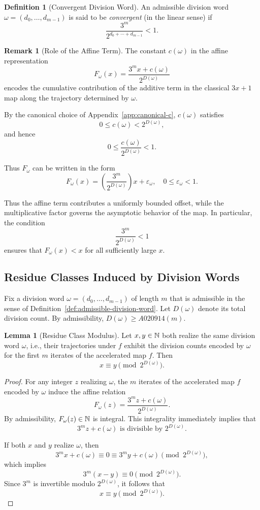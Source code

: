 \documentclass[12pt, oneside]{article}   	%
\numberwithin{equation}{section}          %
\theoremstyle{definition}
\newtheorem{define}{Definition}[section]
\newtheorem{lemma}[theorem]{Lemma}
\newtheorem*{remark}{Remark}
\begin{document}
\begin{define}[Convergent Division Word]
An admissible division word $\omega = (d_0,\dots,d_{m-1})$ is said to be
\emph{convergent} (in the linear sense) if
\[
\frac{3^m}{2^{d_0+\cdots+d_{m-1}}} < 1.
\]
\end{define}

\begin{remark}[Role of the Affine Term]
The constant $c(\omega)$ in the affine representation
\[
F_\omega(x) = \frac{3^m x + c(\omega)}{2^{D(\omega)}}
\]
encodes the cumulative contribution of the additive term in the classical
$3x+1$ map along the trajectory determined by $\omega$.

By the canonical choice of Appendix~\ref{app:canonical-c}, $c(\omega)$ satisfies
\[
0 \le c(\omega) < 2^{D(\omega)},
\]
and hence
\[
0 \le \frac{c(\omega)}{2^{D(\omega)}} < 1.
\]

Thus $F_\omega$ can be written in the form
\[
F_\omega(x) = \left(\frac{3^m}{2^{D(\omega)}}\right)x + \varepsilon_\omega,
\quad 0 \le \varepsilon_\omega < 1.
\]

Thus the affine term contributes a uniformly bounded offset,
while the multiplicative factor governs the asymptotic behavior of the map.
In particular, the condition
\[
\frac{3^m}{2^{D(\omega)}} < 1
\]
ensures that $F_\omega(x) < x$ for all sufficiently large $x$.
\end{remark}


\subsection{Residue Classes Induced by Division Words}

Fix a division word $\omega = (d_0,\dots,d_{m-1})$ of length $m$ that is admissible
in the sense of Definition~\ref{def:admissible-division-word}. Let $D(\omega)$
denote its total division count. By admissibility, $D(\omega) \ge A020914(m)$.

\begin{lemma}[Residue Class Modulus]
\label{lem:residue-modulus}
Let $x,y \in \mathbb{N}$ both realize the same division word $\omega$, i.e.,
their trajectories under $f$ exhibit the division counts encoded by $\omega$
for the first $m$ iterates of the accelerated map $f$. Then
\[
x \equiv y \pmod{2^{D(\omega)}}.
\]
\end{lemma}

\begin{proof}
For any integer $z$ realizing $\omega$, the $m$ iterates of the accelerated map
$f$ encoded by $\omega$ induce the affine relation
\[
F_\omega(z) = \frac{3^m z + c(\omega)}{2^{D(\omega)}}.
\]
By admissibility, $F_\omega(z)\in\mathbb{N}$ is integral. This integrality
immediately implies that
\[
3^m z + c(\omega) \text{ is divisible by } 2^{D(\omega)}.
\]

If both $x$ and $y$ realize $\omega$, then
\[
3^m x + c(\omega) \equiv 0 \equiv 3^m y + c(\omega) \pmod{2^{D(\omega)}},
\]
which implies
\[
3^m(x-y) \equiv 0 \pmod{2^{D(\omega)}}.
\]
Since $3^m$ is invertible modulo $2^{D(\omega)}$, it follows that
\[
x \equiv y \pmod{2^{D(\omega)}}.
\]
\end{proof}
\end{document}
